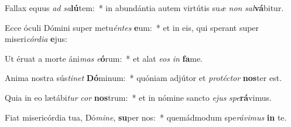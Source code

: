 \item Fallax equus \textit{ad} \textit{sa}\textbf{lú}tem:~* in abundántia autem virtútis su\textit{æ} \textit{non} \textit{sal}\textbf{vá}bitur.
\item Ecce óculi Dómini super metu\textit{én}\textit{tes} \textbf{e}um:~* et in eis, qui sperant super miseri\textit{cór}\textit{di}\textit{a} \textbf{e}jus:
\item Ut éruat a morte áni\textit{mas} \textit{e}\textbf{ó}rum:~* et alat \textit{e}\textit{os} \textit{in} \textbf{fa}me.
\item Anima nostra sús\textit{ti}\textit{net} \textbf{Dó}minum:~* quóniam adjútor et \textit{pro}\textit{téc}\textit{tor} \textbf{nos}ter est.
\item Quia in eo lætábi\textit{tur} \textit{cor} \textbf{nos}trum:~* et in nómine sancto \textit{e}\textit{jus} \textit{spe}\textbf{rá}vimus.
\item Fiat misericórdia tua, Dó\textit{mi}\textit{ne}, \textbf{su}per nos:~* quemádmodum spe\textit{rá}\textit{vi}\textit{mus} \textbf{in} te.
